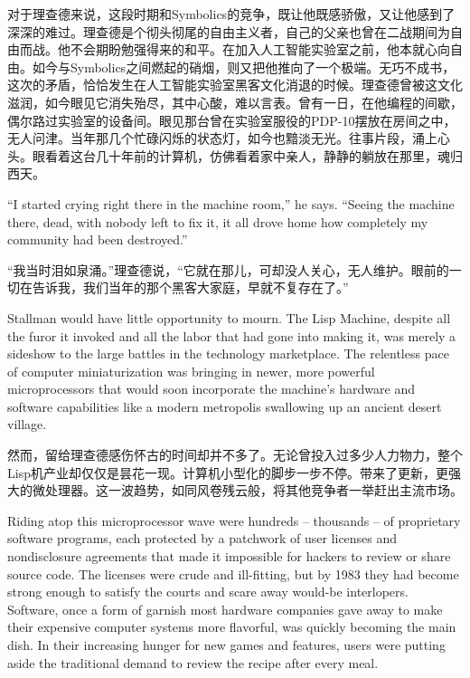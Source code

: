\ifdefined\chs
对于理查德来说，这段时期和Symbolics的竞争，既让他既感骄傲，又让他感到了深深的难过。理查德是个彻头彻尾的自由主义者，自己的父亲也曾在二战期间为自由而战。他不会期盼勉强得来的和平。在加入人工智能实验室之前，他本就心向自由。如今与Symbolics之间燃起的硝烟，则又把他推向了一个极端。无巧不成书，这次的矛盾，恰恰发生在人工智能实验室黑客文化消退的时候。理查德曾被这文化滋润，如今眼见它消失殆尽，其中心酸，难以言表。曾有一日，在他编程的间歇，偶尔路过实验室的设备间。眼见那台曾在实验室服役的PDP-10摆放在房间之中，无人问津。当年那几个忙碌闪烁的状态灯，如今也黯淡无光。往事片段，涌上心头。眼看着这台几十年前的计算机，仿佛看着家中亲人，静静的躺放在那里，魂归西天。
\fi

\ifdefined\eng
``I started crying right there in the machine room,'' he says. ``Seeing the machine there, dead, with nobody left to fix it, it all drove home how completely my community had been destroyed.''
\fi

\ifdefined\chs
“我当时泪如泉涌。”理查德说，“它就在那儿，可却没人关心，无人维护。眼前的一切在告诉我，我们当年的那个黑客大家庭，早就不复存在了。”
\fi

\ifdefined\eng
Stallman would have little opportunity to mourn. The Lisp Machine, despite all the furor it invoked and all the labor that had gone into making it, was merely a sideshow to the large battles in the technology marketplace. The relentless pace of computer miniaturization was bringing in newer, more powerful microprocessors that would soon incorporate the machine's hardware and software capabilities like a modern metropolis swallowing up an ancient desert village.
\fi

\ifdefined\chs
然而，留给理查德感伤怀古的时间却并不多了。无论曾投入过多少人力物力，整个Lisp机产业却仅仅是昙花一现。计算机小型化的脚步一步不停。带来了更新，更强大的微处理器。这一波趋势，如同风卷残云般，将其他竞争者一举赶出主流市场。
\fi

\ifdefined\eng
Riding atop this microprocessor wave were hundreds -- thousands -- of proprietary software programs, each protected by a patchwork of user licenses and nondisclosure agreements that made it impossible for hackers to review or share source code. The licenses were crude and ill-fitting, but by 1983 they had become strong enough to satisfy the courts and scare away would-be interlopers. Software, once a form of garnish most hardware companies gave away to make their expensive computer systems more flavorful, was quickly becoming the main dish. In their increasing hunger for new games and features, users were putting aside the traditional demand to review the recipe after every meal.
\fi

